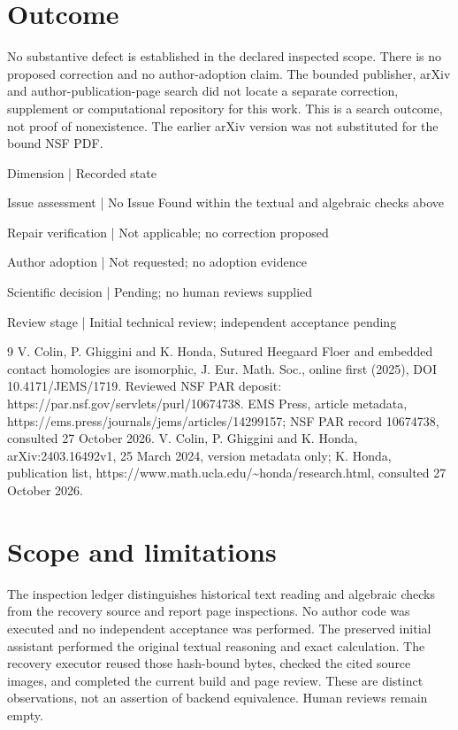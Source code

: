 \documentclass[10pt]{article}
\begin{document}
\section*{Outcome}
No substantive defect is established in the declared inspected scope. There is no proposed correction and no author-adoption claim. The bounded publisher, arXiv and author-publication-page search did not locate a separate correction, supplement or computational repository for this work. This is a search outcome, not proof of nonexistence. The earlier arXiv version was not substituted for the bound NSF PDF.\par
Dimension | Recorded state\par
Issue assessment | No Issue Found within the textual and algebraic checks above\par
Repair verification | Not applicable; no correction proposed\par
Author adoption | Not requested; no adoption evidence\par
Scientific decision | Pending; no human reviews supplied\par
Review stage | Initial technical review; independent acceptance pending\par
9 V. Colin, P. Ghiggini and K. Honda, Sutured Heegaard Floer and embedded contact homologies are isomorphic, J. Eur. Math. Soc., online first (2025), DOI 10.4171/JEMS/1719. Reviewed NSF PAR deposit: https://par.nsf.gov/servlets/purl/10674738. EMS Press, article metadata, https://ems.press/journals/jems/articles/14299157; NSF PAR record 10674738, consulted 27 October 2026. V. Colin, P. Ghiggini and K. Honda, arXiv:2403.16492v1, 25 March 2024, version metadata only; K. Honda, publication list, https://www.math.ucla.edu/\textasciitilde{}honda/research.html, consulted 27 October 2026.\par
\section*{Scope and limitations}
The inspection ledger distinguishes historical text reading and algebraic checks from the recovery source and report page inspections. No author code was executed and no independent acceptance was performed. The preserved initial assistant performed the original textual reasoning and exact calculation. The recovery executor reused those hash-bound bytes, checked the cited source images, and completed the current build and page review. These are distinct observations, not an assertion of backend equivalence. Human reviews remain empty.\par
\end{document}

